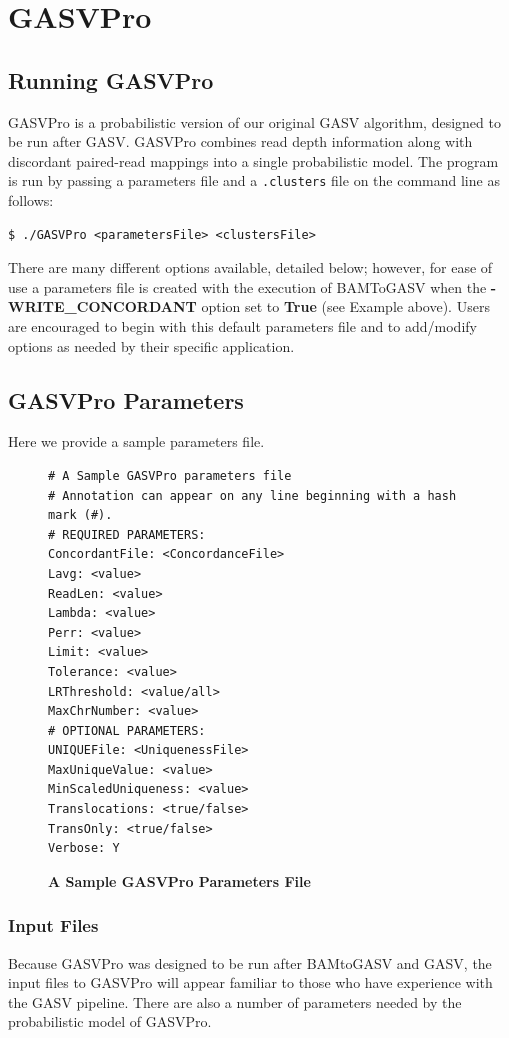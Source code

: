 \documentclass[11pt]{article}
\begin{document}
\section{GASVPro}

\subsection{Running GASVPro}

GASVPro is a probabilistic version of our original GASV algorithm, designed to be run after GASV. GASVPro combines read depth information along with discordant paired-read mappings into a single probabilistic model. The program is run by passing a parameters file and a \verb+.clusters+ file on the command line as follows:
\begin{Verbatim}[frame=single]
$ ./GASVPro <parametersFile> <clustersFile>
\end{Verbatim}
 There are many different options available, detailed below; however, for ease of use a parameters file is created with the execution of BAMToGASV when the {\bf-WRITE\_CONCORDANT} option set to {\bf True} (see Example above). Users are encouraged to begin with this default parameters file and to add/modify options as needed by their specific application.

\subsection{GASVPro Parameters} 

Here we provide a sample parameters file. 
\begin{figure}[H]
\begin{Verbatim}[frame=single]
# A Sample GASVPro parameters file
# Annotation can appear on any line beginning with a hash mark (#).
# REQUIRED PARAMETERS:
ConcordantFile: <ConcordanceFile>
Lavg: <value>
ReadLen: <value>
Lambda: <value>
Perr: <value>
Limit: <value>
Tolerance: <value>
LRThreshold: <value/all>
MaxChrNumber: <value>
# OPTIONAL PARAMETERS: 
UNIQUEFile: <UniquenessFile>
MaxUniqueValue: <value>
MinScaledUniqueness: <value>
Translocations: <true/false>
TransOnly: <true/false>
Verbose: Y
\end{Verbatim}
\caption{\bf A Sample GASVPro Parameters File}
\end{figure}


\subsubsection{Input Files}
Because GASVPro was designed to be run after BAMtoGASV and GASV, the input files to GASVPro will appear familiar to those who have experience with the GASV pipeline. There are also a number of parameters needed by the probabilistic model of GASVPro.
\end{document}
